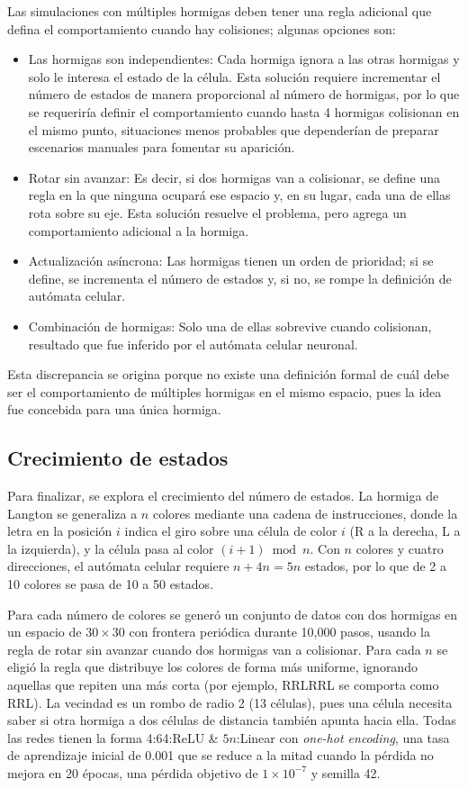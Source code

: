 Las simulaciones con múltiples hormigas deben tener una regla adicional que defina el comportamiento cuando hay colisiones; algunas opciones son:
\begin{itemize}
	\item Las hormigas son independientes: Cada hormiga ignora a las otras hormigas y solo le interesa el estado de la célula. Esta solución requiere incrementar el número de estados de manera proporcional al número de hormigas, por lo que se requeriría definir el comportamiento cuando hasta 4 hormigas colisionan en el mismo punto, situaciones menos probables que dependerían de preparar escenarios manuales para fomentar su aparición.
	\item Rotar sin avanzar: Es decir, si dos hormigas van a colisionar, se define una regla en la que ninguna ocupará ese espacio y, en su lugar, cada una de ellas rota sobre su eje. Esta solución resuelve el problema, pero agrega un comportamiento adicional a la hormiga. 
	\item Actualización asíncrona: Las hormigas tienen un orden de prioridad; si se define, se incrementa el número de estados y, si no, se rompe la definición de autómata celular.
	\item Combinación de hormigas: Solo una de ellas sobrevive cuando colisionan, resultado que fue inferido por el autómata celular neuronal.
\end{itemize}

Esta discrepancia se origina porque no existe una definición formal de cuál debe ser el comportamiento de múltiples hormigas en el mismo espacio, pues la idea fue concebida para una única hormiga.

\subsection{Crecimiento de estados}

Para finalizar, se explora el crecimiento del número de estados. La hormiga de Langton se generaliza a $n$ colores mediante una cadena de instrucciones, donde la letra en la posición $i$ indica el giro sobre una célula de color $i$ (R a la derecha, L a la izquierda), y la célula pasa al color $(i+1) \bmod n$. Con $n$ colores y cuatro direcciones, el autómata celular requiere $n + 4n = 5n$ estados, por lo que de 2 a 10 colores se pasa de 10 a 50 estados.

Para cada número de colores se generó un conjunto de datos con dos hormigas en un espacio de $30 \times 30$ con frontera periódica durante 10,000 pasos, usando la regla de rotar sin avanzar cuando dos hormigas van a colisionar. Para cada $n$ se eligió la regla que distribuye los colores de forma más uniforme, ignorando aquellas que repiten una más corta (por ejemplo, RRLRRL se comporta como RRL). La vecindad es un rombo de radio 2 (13 células), pues una célula necesita saber si otra hormiga a dos células de distancia también apunta hacia ella. Todas las redes tienen la forma 4:64:ReLU \& $5n$:Linear con \textit{one-hot encoding}, una tasa de aprendizaje inicial de 0.001 que se reduce a la mitad cuando la pérdida no mejora en 20 épocas, una pérdida objetivo de $1 \times 10^{-7}$ y semilla 42.

